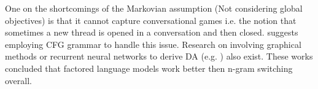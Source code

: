 One on the shortcomings of the Markovian assumption (Not considering global objectives) is that it cannot capture conversational games i.e. the notion that sometimes a new thread is opened in a conversation and then closed. 
\cite{Geertzen} suggests employing CFG grammar to handle this issue.
Research on involving graphical methods or recurrent neural networks to derive DA (e.g. \cite{DBLP:conf/icassp/JiB05,DBLP:conf/coling/WermterL96}) also exist. These works concluded that factored language models work better then n-gram switching overall.